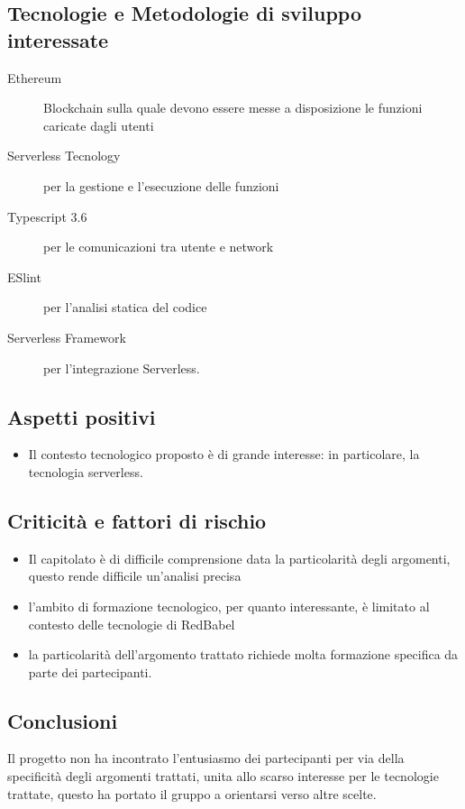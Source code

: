 \documentclass[../studio-di-fattibilita.tex]{subfiles}
\begin{document}
  \subsection{Tecnologie e Metodologie di sviluppo interessate}%
  \label{subsec:tecnologie_interessate}
  \begin{description}
    \item[Ethereum] Blockchain sulla quale devono essere messe a disposizione le funzioni caricate dagli utenti
    \item[Serverless Tecnology] per la gestione e l'esecuzione delle funzioni
    \item[Typescript 3.6] per le comunicazioni tra utente e network
    \item[ESlint] per l'analisi statica del codice
    \item[Serverless Framework] per l'integrazione Serverless.
  \end{description}
  \subsection{Aspetti positivi}%
  \label{subsec:aspetti_positivi}
  \begin{itemize}
    \item Il contesto tecnologico proposto è di grande interesse: in particolare, la tecnologia serverless.
  \end{itemize}
  \subsection{Criticità e fattori di rischio}%
  \label{subsec:criticita_e_fattori_di_rischio}
  \begin{itemize}
    \item Il capitolato è di difficile comprensione data la particolarità degli argomenti, questo rende difficile un'analisi precisa
    \item l'ambito di formazione tecnologico, per quanto interessante, è limitato al contesto delle tecnologie di RedBabel
    \item la particolarità dell'argomento trattato richiede molta formazione specifica da parte dei partecipanti.
  \end{itemize}
  \subsection{Conclusioni}%
  \label{subsec:conclusioni}
  Il progetto non ha incontrato l'entusiasmo dei partecipanti per via della specificità degli argomenti trattati, unita allo scarso interesse per le tecnologie trattate, questo ha portato il gruppo a orientarsi verso altre scelte.
\end{document}
